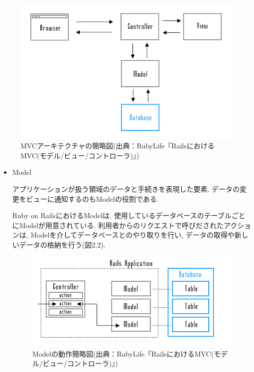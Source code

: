 \begin{description}
\begin{figure}
\begin{center}
\includegraphics[width=14cm]{fig/mvc.png}
\caption{MVCアーキテクチャの簡略図(出典：RubyLife『RailsにおけるMVC(モデル/ビュー/コントローラ)』)}
\end{center}
\end{figure}

\begin{itemize}
\item Model

アプリケーションが扱う領域のデータと手続きを表現した要素.
データの変更をビューに通知するのもModelの役割である.

Ruby on RailsにおけるModelは, 使用しているデータベースのテーブルごとにModelが用意されている.
利用者からのリクエストで呼びだされたアクションは, Modelを介してデータベースとのやり取りを行い, データの取得や新しいデータの格納を行う(図2.2).

\begin{figure}
\begin{center}
\includegraphics[width=14cm]{fig/model.png}
\caption{Modelの動作簡略図(出典：RubyLife『RailsにおけるMVC(モデル/ビュー/コントローラ)』)}
\end{center}
\end{figure}


\end{itemize}
\end{description}
